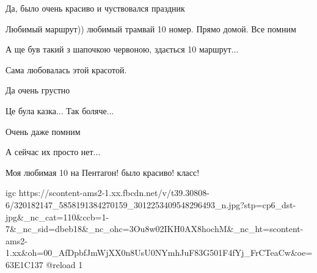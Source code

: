 
 
 
 
 



Да, было очень красиво и чуствовался праздник


Любимый маршрут)) любимый трамвай 10 номер. Прямо домой. Все помним


А ще був такий з шапочкою червоною, здається 10 маршрут...


Сама любовалась этой красотой.


Да очень грустно


Це була казка... Так боляче...


Очень даже помним


А сейчас их просто нет...


Моя любимая 10 на Пентагон! было красиво! класс!


\ifcmt
  igc https://scontent-ams2-1.xx.fbcdn.net/v/t39.30808-6/320182147_5858191384270159_3012253409548296493_n.jpg?stp=cp6_dst-jpg&_nc_cat=110&ccb=1-7&_nc_sid=dbeb18&_nc_ohc=3Ou8w02IKH0AX8hochM&_nc_ht=scontent-ams2-1.xx&oh=00_AfDpbfJmWjXX0n8UsU0NYmhJuF83G501F4fYj_FrCTeaCw&oe=63E1C137
	@reload 1
\fi
